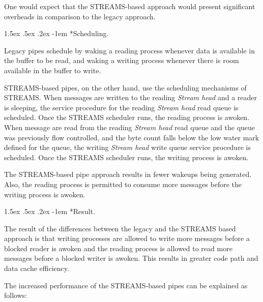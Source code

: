 \documentclass[letterpaper,final,notitlepage,twocolumn,10pt,twoside]{article}
\makeatletter
\let\normalsize\small
\let\small\footnotesize
\let\footnotesize\scriptsize
\let\scriptsize\tiny
\renewcommand\paragraph{\@startsection{paragraph}{4}{\z@}%
                                    {1.5ex \@plus .5ex \@minus .2ex}%
                                    {-1em}%
                                    {\normalfont\normalsize\bfseries\slshape}}
\makeatother
\begin{document}
One would expect that the STREAMS-based approach would present significant
overheads in comparison to the legacy approach.

\paragraph*{Scheduling.}

Legacy pipes schedule by waking a reading process whenever data is available
in the buffer to be read, and waking a writing process whenever there is room
available in the buffer to write.

STREAMS-based pipes, on the other hand, use the scheduling mechanisms of
STREAMS.  When messages are written to the reading \textit{Stream head} and a
reader is sleeping, the service procedure for the reading \textit{Stream head}
read queue is scheduled.  Once the STREAMS scheduler runs, the reading process
is awoken.  When message are read from the reading \textit{Stream head} read
queue and the queue was previously flow controlled, and the byte count falls
below the low water mark defined for the queue, the writing \textit{Stream
head} write queue service procedure is scheduled.  Once the STREAMS scheduler
runs, the writing process is awoken.

The STREAMS-based pipe approach results in fewer wakeups being generated.
Also, the reading process is permitted to consume more messages before the
writing process is awoken.

\paragraph*{Result.}

The result of the differences between the legacy and the STREAMS based
approach is that writing processes are allowed to write more messages before a
blocked reader is awoken and the reading process is allowed to read more
messages before a blocked writer is awoken.  This results in greater code path
and data cache efficiency.

The increased performance of the STREAMS-based pipes can be explained as
follows:
\end{document}
